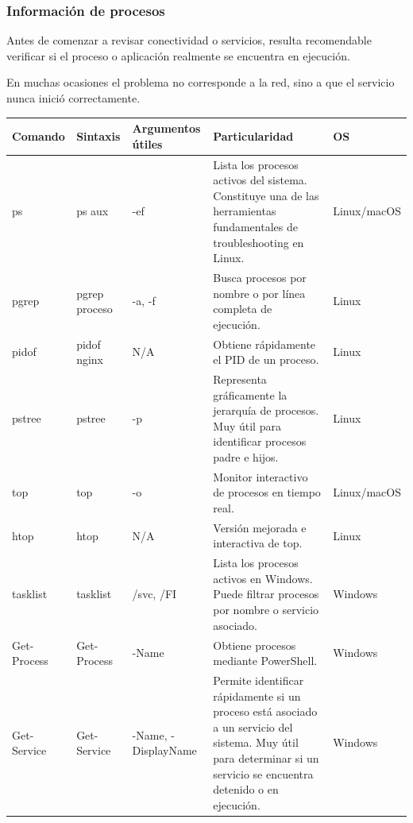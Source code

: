 \documentclass[a4paper,10pt]{article}
\begin{document}

\subsubsection{Información de procesos}

Antes de comenzar a revisar conectividad o servicios, resulta recomendable
verificar si el proceso o aplicación realmente se encuentra en ejecución.

En muchas ocasiones el problema no corresponde a la red, sino a que el
servicio nunca inició correctamente.

\begin{longtable}{|p{2.8cm}|p{3cm}|p{4cm}|p{5.6cm}|p{1.5cm}|}

\hline
Comando &
Sintaxis &
Argumentos útiles &
Particularidad &
OS
\\
\hline
\endhead

ps &
ps aux &
-ef &
Lista los procesos activos del sistema. Constituye una de las herramientas fundamentales de troubleshooting en Linux. &
Linux/macOS
\\
\hline

pgrep &
pgrep proceso &
-a, -f &
Busca procesos por nombre o por línea completa de ejecución. &
Linux
\\
\hline

pidof &
pidof nginx &
N/A &
Obtiene rápidamente el PID de un proceso. &
Linux
\\
\hline

pstree &
pstree &
-p &
Representa gráficamente la jerarquía de procesos. Muy útil para identificar procesos padre e hijos. &
Linux
\\
\hline

top &
top &
-o &
Monitor interactivo de procesos en tiempo real. &
Linux/macOS
\\
\hline

htop &
htop &
N/A &
Versión mejorada e interactiva de top. &
Linux
\\
\hline

tasklist &
tasklist &
/svc, /FI &
Lista los procesos activos en Windows. Puede filtrar procesos por nombre o servicio asociado. &
Windows
\\
\hline

Get-Process &
Get-Process &
-Name &
Obtiene procesos mediante PowerShell. &
Windows
\\
\hline

Get-Service &
Get-Service &
-Name, -DisplayName &
Permite identificar rápidamente si un proceso está asociado a un servicio del sistema. Muy útil para determinar si un servicio se encuentra detenido o en ejecución. &
Windows
\\
\hline


\end{longtable}
\end{document}
